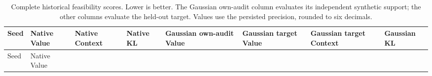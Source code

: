 \begin{longtable}[]{@{}
  >{\raggedright\arraybackslash}p{}
  >{\raggedleft\arraybackslash}p{}
  >{\raggedleft\arraybackslash}p{}
  >{\raggedleft\arraybackslash}p{}
  >{\raggedleft\arraybackslash}p{}
  >{\raggedleft\arraybackslash}p{}
  >{\raggedleft\arraybackslash}p{}
  >{\raggedleft\arraybackslash}p{}@{}}
\caption{Complete historical feasibility scores. Lower is better. The Gaussian own-audit column evaluates its independent synthetic support; the other columns evaluate the held-out target. Values use the persisted precision, rounded to six decimals.}\label{tbl:B1}\tabularnewline
\toprule\noalign{}
\begin{minipage}[b]{\linewidth}\raggedright
Seed
\end{minipage} & \begin{minipage}[b]{\linewidth}\raggedleft
Native Value
\end{minipage} & \begin{minipage}[b]{\linewidth}\raggedleft
Native Context
\end{minipage} & \begin{minipage}[b]{\linewidth}\raggedleft
Native KL
\end{minipage} & \begin{minipage}[b]{\linewidth}\raggedleft
Gaussian own-audit Value
\end{minipage} & \begin{minipage}[b]{\linewidth}\raggedleft
Gaussian target Value
\end{minipage} & \begin{minipage}[b]{\linewidth}\raggedleft
Gaussian target Context
\end{minipage} & \begin{minipage}[b]{\linewidth}\raggedleft
Gaussian KL
\end{minipage} \\
\midrule\noalign{}
\endfirsthead
\toprule\noalign{}
\begin{minipage}[b]{\linewidth}\raggedright
Seed
\end{minipage} & \begin{minipage}[b]{\linewidth}\raggedleft
Native Value
\end{minipage} & \begin{minipage}[b]{\linewidth}\raggedleft

\end{minipage}
\end{longtable}
